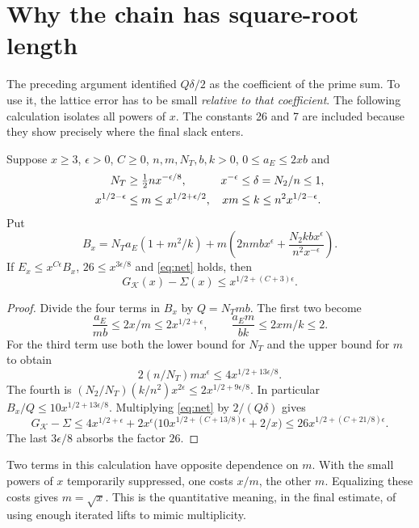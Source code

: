 \documentclass[11pt,a4paper]{article}
\theoremstyle{definition}\newtheorem{arithinput}[theorem]{Arithmetic input}
\begin{document}
\section{Why the chain has square-root length}\label{sec:size}
The preceding argument identified $Q\delta/2$ as the coefficient of the prime sum. To use it, the lattice error has to be small \emph{relative to that coefficient}. The following calculation isolates all powers of $x$. The constants 26 and 7 are included because they show precisely where the final slack enters.
\begin{prop}\label{pr:size}
Suppose $x\ge3$, $\epsilon>0$, $C\ge0$, $n,m,N_T,b,k>0$, $0\le a_E\le 2xb$ and
\begin{align}
 N_T&\ge \tfrac12 n x^{-\epsilon/8},& x^{-\epsilon}&\le\delta=N_2/n\le1,\notag\\
 x^{1/2-\epsilon}&\le m\le x^{1/2+\epsilon/2},&
 xm&\le k\le n^2 x^{1/2-\epsilon}. \label{eq:sizes}
\end{align}
Put
\begin{equation}
 B_x=N_Ta_E(1+m^2/k)+
      m\left(2nmbx^\epsilon+
          \frac{N_2 k b x^\epsilon}{n^2 x^{-\epsilon}}\right). \label{eq:bracket}
\end{equation}
If $E_x\le x^{C\epsilon}B_x$, $26\le x^{3\epsilon/8}$ and \eqref{eq:net} holds, then
\[
 G_{\mathcal K}(x)-\Sigma(x)\le x^{1/2+(C+3)\epsilon}.
\]
\end{prop}
\begin{proof}
Divide the four terms in $B_x$ by $Q=N_Tmb$. The first two become
\[
 \frac{a_E}{mb}\le 2x/m\le2x^{1/2+\epsilon},
 \qquad \frac{a_Em}{bk}\le 2xm/k\le2.
\]
For the third term use both the lower bound for $N_T$ and the upper bound for $m$ to obtain
\[
 2(n/N_T)m x^\epsilon\le4x^{1/2+13\epsilon/8}.
\]
The fourth is $(N_2/N_T)(k/n^2)x^{2\epsilon}\le2x^{1/2+9\epsilon/8}$. In particular $B_x/Q\le10x^{1/2+13\epsilon/8}$. Multiplying \eqref{eq:net} by $2/(Q\delta)$ gives
\[
 G_{\mathcal K}-\Sigma\le4x^{1/2+\epsilon}
       +2x^\epsilon\big(10x^{1/2+(C+13/8)\epsilon}+2/x\big)
 \le26x^{1/2+(C+21/8)\epsilon}.
\]
The last $3\epsilon/8$ absorbs the factor $26$.
\end{proof}
Two terms in this calculation have opposite dependence on $m$. With the small powers of $x$ temporarily suppressed, one costs $x/m$, the other $m$. Equalizing these costs gives $m=\sqrt x$. This is the quantitative meaning, in the final estimate, of using enough iterated lifts to mimic multiplicity.
\end{document}
